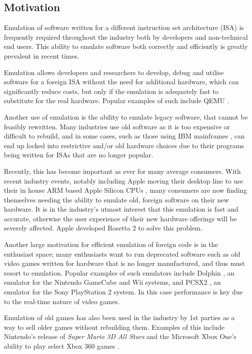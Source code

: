 \subsection{Motivation}

Emulation of software written for a different instruction set architecture (ISA) is frequently required throughout the industry both by developers and non-technical end users. This ability to emulate software both correctly and efficiently is greatly prevalent in recent times.

Emulation allows developers and researchers to develop, debug and utilise software for a foreign ISA without the need for additional hardware, which can significantly reduce costs, but only if the emulation is adequately fast to substitute for the real hardware. Popular examples of such include QEMU \cite{qemu}.

Another use of emulation is the ability to emulate legacy software, that cannot be feasibly rewritten. Many industries use old software as it is too expensive or difficult to rebuild, and in some cases, such as those using IBM mainframes \cite{ibm-mainframe}, can end up locked into restrictive and/or old hardware choices due to their programs being written for ISAs that are no longer popular.

Recently, this has become important as ever for many average consumers. With recent industry events, notably including Apple moving their desktop line to use their in house ARM based Apple Silicon CPUs \cite{apple-silicon,rosetta2}, many consumers are now finding themselves needing the ability to emulate old, foreign software on their new hardware. It is in the industry's utmost interest that this emulation is fast and accurate, otherwise the user experience of their new hardware offerings will be severely affected. Apple developed Rosetta 2 \cite{rosetta2} to solve this problem.

Another large motivation for efficient emulation of foreign code is in the enthusiast space; many enthusiasts want to run deprecated software such as old video games written for hardware that is no longer manufactured, and thus must resort to emulation. Popular examples of such emulators include Dolphin \cite{dolphin}, an emulator for the Nintendo GameCube and Wii systems, and PCSX2 \cite{PCSX2}, an emulator for the Sony PlayStation 2 system. In this case performance is key due to the real-time nature of video games.

Emulation of old games has also been used in the industry by 1st parties as a way to sell older games without rebuilding them. Examples of this include Nintendo's release of \emph{Super Mario 3D All Stars} \cite{mario-emulation} and the Microsoft Xbox One's ability to play select Xbox 360 games \cite{xbox360-emulation}.
